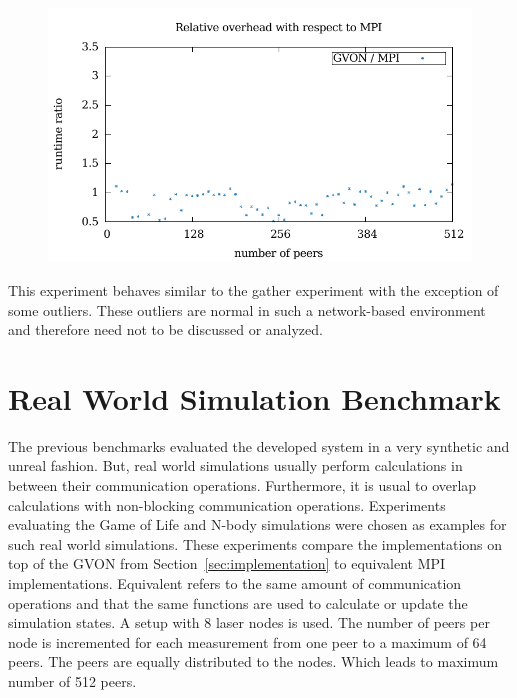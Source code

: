 \begin{figure}[H]
\begin{minipage}[t]{0.5\textwidth}
    \includegraphics[width=\textwidth]{plots/50_reduce_network_overhead_gvon_laser}
  \end{minipage}%
  \caption{ }
  \label{fig:reduce_laser}
\end{figure}

\noindent This experiment behaves similar to the gather experiment
with the exception of some outliers. These outliers are normal in such
a network-based environment and therefore need not to be discussed or
analyzed.


\section{Real World Simulation Benchmark}
\label{sec:eval:real}
The previous benchmarks evaluated the developed system in a very
synthetic and unreal fashion. But, real world simulations
usually perform calculations in between their communication
operations. Furthermore, it is usual to overlap calculations with
non-blocking communication operations. Experiments evaluating the Game
of Life and N-body simulations were chosen as examples for such real
world simulations. These experiments compare the implementations on
top of the GVON from Section~\ref{sec:implementation} to equivalent
MPI implementations.  Equivalent refers to the same amount of
communication operations and that the same functions are used to
calculate or update the simulation states. A setup with 8 laser nodes
is used. The number of peers per node is incremented for each
measurement from one peer to a maximum of 64 peers. The peers are
equally distributed to the nodes.  Which leads to maximum number of
512 peers.


